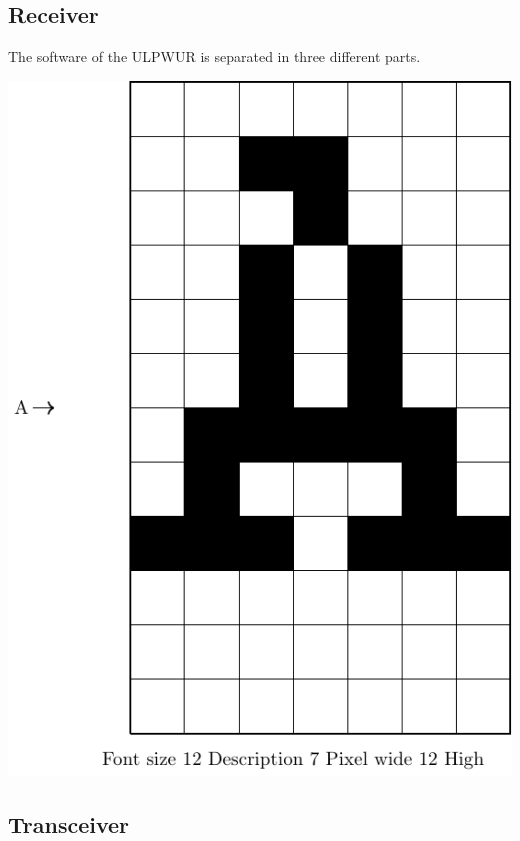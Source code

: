 \subsection{Receiver}

The software of the ULPWUR is separated in three different parts. 

\includegraphics[scale=0.3]{4-development/software/graphics/font12.pdf}


\subsection{Transceiver}